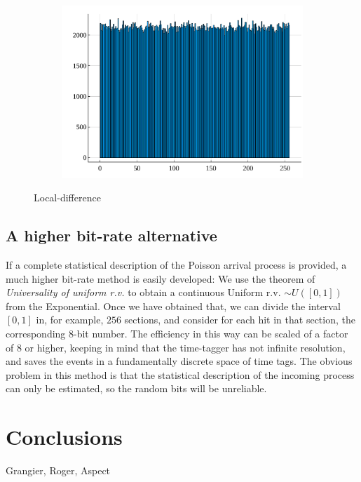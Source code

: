 \documentclass[10pt, final]{article}
\begin{document}
\begin{multicols}{2}
\begin{mdframed}
\begin{figure}[H]
        \begin{subfigure}{\textwidth}
            \centering
            \includegraphics[width = \textwidth]{../random_img/naif-histogram.pdf}
            \caption{}
        \end{subfigure}
        \caption{Local-difference}
    \end{figure}
\end{mdframed}
\subsection*{A higher bit-rate alternative}
If a complete statistical description of the Poisson arrival process is provided, a much higher bit-rate method is easily developed:
We use the theorem of \emph{Universality of uniform r.v.} to obtain a continuous Uniform r.v. $\sim U([0, 1])$ from the Exponential. Once we have obtained that, we can divide the interval $[0, 1]$ in, for example, $256$ sections, and consider for each hit in that section, the corresponding $8$-bit number. The efficiency in this way can be scaled of a factor of $8$ or higher, keeping in mind that the time-tagger has not infinite resolution, and saves the events in a fundamentally discrete space of time tags.
The obvious problem in this method is that the statistical description of the incoming process can only be estimated, so the random bits will be unreliable.


\section*{Conclusions}


\begin{thebibliography}{99}
   Grangier, Roger, Aspect
\end{thebibliography}
\end{multicols}
\end{document}
